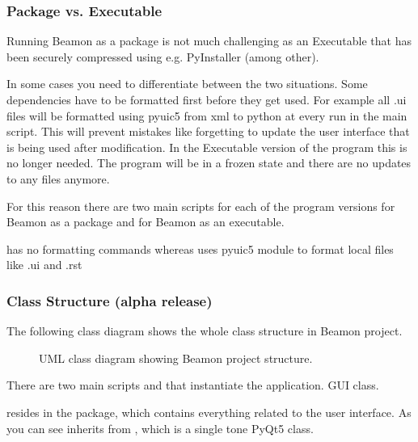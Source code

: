 \documentclass[letterpaper,10pt,english]{sphinxmanual}
\begin{document}
\subsubsection{Package vs. Executable}
\label{\detokenize{implementation:package-vs-executable}}
Running Beamon as a package is not much challenging as an Executable that has been securely compressed using
e.g. PyInstaller (among other).

In some cases you need to differentiate between the two situations.
Some dependencies have to be formatted first before they get used. For example all .ui files will be formatted
using pyuic5 from xml to python at every run in the main script. This will prevent mistakes like forgetting
to update the user interface that is being used after modification.
In the Executable version of the program this is no longer needed. The program will be in a frozen state and there
are no updates to any files anymore.

For this reason there are two main scripts for each of the program versions
 for Beamon as a package and  for Beamon as an executable.

 has no formatting commands whereas  uses pyuic5 module to format local files like .ui and
.rst


\subsubsection{Class Structure (alpha release)}
\label{\detokenize{implementation:class-structure-alpha-release}}
The following class diagram shows the whole class structure in Beamon project.

\begin{figure}[htbp]
\centering
\capstart

\noindent{}
\caption{UML class diagram showing Beamon project structure.}\label{\detokenize{implementation:id3}}\end{figure}

There are two main scripts  and  that instantiate the application.
GUI class.

 resides in the  package, which contains everything related to the user interface.
As you can see  inherits from , which is a single tone PyQt5 class.
\end{document}
